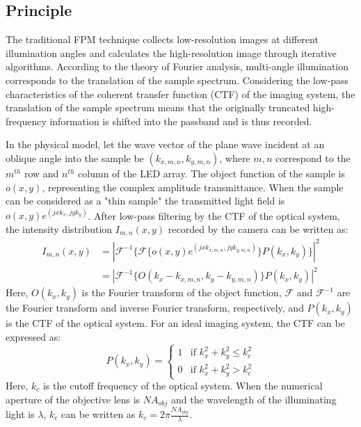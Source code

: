 \documentclass[journal,review,submit,pdftex,moreauthors]{Definitions/mdpi}
\begin{document}
\subsection{Principle}
The traditional FPM technique collects low-resolution images at different illumination angles and calculates the high-resolution image through iterative algorithms. According to the theory of Fourier analysis, multi-angle illumination corresponds to the translation of the sample spectrum. Considering the low-pass characteristics of the coherent transfer function (CTF) of the imaging system, the translation of the sample spectrum means that the originally truncated high-frequency information is shifted into the passband and is thus recorded.

In the physical model, let the wave vector of the plane wave incident at an oblique angle into the sample be $(k_{x,m,n},k_{y,m,n})$, where $m,n$ correspond to the $m^{th}$ row and $n^{th}$ column of the LED array. The object function of the sample is $o(x,y)$, representing the complex amplitude transmittance. When the sample can be considered as a "thin sample" the transmitted light field is $o(x,y)e^{(jxk_x,jyk_y)}$. After low-pass filtering by the CTF of the optical system, the intensity distribution $I_{m,n}(x,y)$ recorded by the camera can be written as:
\begin{equation}
\begin{split}
I_{m,n}(x,y) &= |\mathscr{F}^{-1}\{\mathscr{F}\{o(x,y)e^{(jxk_{x,m,n},jyk_{y,m,n})}\}P(k_x,k_y)\}|^2 \\
&= |\mathscr{F}^{-1}\{O(k_x-k_{x,m,n},k_y-k_{y,m,n})\}P(k_x,k_y)|^2
\end{split}
\end{equation}
Here, $O(k_x, k_y)$ is the Fourier transform of the object function, $\mathscr{F}$ and $\mathscr{F}^{-1}$ are the Fourier transform and inverse Fourier transform, respectively, and $P(k_x,k_y)$ is the CTF of the optical system. For an ideal imaging system, the CTF can be expressed as:
\begin{equation}
P(k_x,k_y) = 
\begin{cases} 
1 & \text{if } k_x^2+k_y^2\leq k_c^2 \\
0 & \text{if } k_x^2+k_y^2 > k_c^2
\end{cases}
\end{equation}
Here, $k_c$ is the cutoff frequency of the optical system. When the numerical aperture of the objective lens is $NA_{obj}$ and the wavelength of the illuminating light is $\lambda$, $k_c$ can be written as $k_c=2\pi \frac{NA_{obj}}{\lambda}$.
\end{document}
